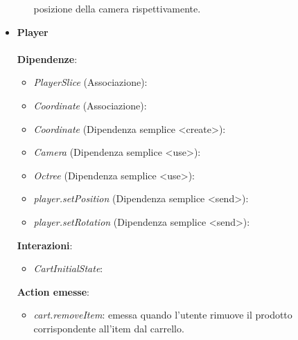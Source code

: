 \begin{itemize}
\begin{itemize}
			posizione della camera rispettivamente.
		\end{itemize}
		\item \textbf{Player}
		\\\\
		\textbf{Dipendenze}:
		\begin{itemize}
			\item \textit{PlayerSlice} (Associazione): 
			\item \textit{Coordinate} (Associazione): 
			\item \textit{Coordinate} (Dipendenza semplice \textless create\textgreater): 
			\item \textit{Camera} (Dipendenza semplice \textless use\textgreater): 
			\item \textit{Octree} (Dipendenza semplice \textless use\textgreater): 
			\item \textit{player.setPosition} (Dipendenza semplice \textless send\textgreater): 
			\item \textit{player.setRotation} (Dipendenza semplice \textless send\textgreater): 
		\end{itemize}
		\textbf{Interazioni}:
		\begin{itemize}
			\item \textit{CartInitialState}: 
		\end{itemize}
		\textbf{Action emesse}:
		\begin{itemize}
			\item \textit{cart.removeItem}: emessa quando l'utente rimuove il prodotto corrispondente all'item dal carrello.
		\end{itemize}
\end{itemize}




